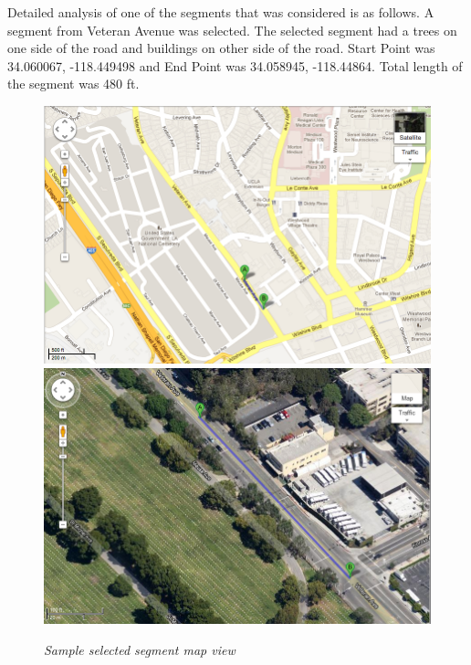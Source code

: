 \documentclass[conference]{IEEETran}
\begin{document}
Detailed analysis of one of the segments that was considered is as follows. A segment from Veteran Avenue was selected. The selected segment had a trees on one side of the road and buildings on other side of the road. Start Point was 34.060067, -118.449498 and End Point was 34.058945, -118.44864. Total length of the segment was 480 ft.\\
\begin{figure}
\begin{center}
\includegraphics[scale=0.3]{veteranMap.png}
\includegraphics[scale=0.3]{veteranSatellite.png}
\caption{\small \sl Sample selected segment map view}\label{fig:veteranSatellite}
\end{center}
\end{figure}
\end{document}
